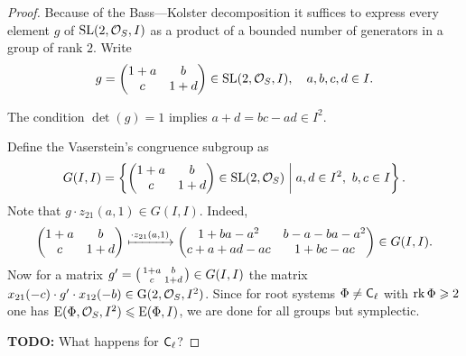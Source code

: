 \begin{proof}
Because of the Bass---Kolster decomposition it suffices to express every element $g$ of $\operatorname{SL}(2,\mathcal{O}_S,I)$ as a product of a bounded number of generators in a group of rank $2$. Write
\[ g=\begin{pmatrix}1+a & b \\ c & 1+d\end{pmatrix}\in\operatorname{SL}(2,\mathcal{O}_S,I),\quad a,b,c,d\in I. \]

The condition $\det(g)=1$ implies $a+d=bc-ad\in I^2$.

Define the Vaserstein's congruence subgroup as
\[ G(I,I)=\left\{ \begin{pmatrix}1+a & b \\ c & 1+d\end{pmatrix}\in\SL(2,\mathcal{O}_S)\;\middle|\; a,d\in I^2,\ b,c\in I \right\}. \]
Note that $g\cdot z_{21}(a,1)\in G(I,I)$. Indeed,
\[
\begin{pmatrix}
1+a & b \\ c & 1+d
\end{pmatrix} \xmapsto{\cdot z_{21}(a,1)}
\begin{pmatrix}
1+ba-a^2 & b-a-ba-a^2 \\ c+a+ad-ac & 1+bc-ac
\end{pmatrix} \in G(I,I).
\]
Now for a matrix $g'=\begin{psmallmatrix}1+a & b \\ c & 1+d\end{psmallmatrix}\in G(I,I)$ the matrix $x_{21}(-c)\cdot g'\cdot x_{12}(-b)\in\operatorname{G}(2,\mathcal{O}_S,I^2)$. Since for root systems $\Phi\neq\mathsf{C}_\ell$ with $\operatorname{rk}\Phi\geqslant2$ one has $\operatorname{E}(\Phi,\mathcal{O}_S,I^2)\leqslant\operatorname{E}(\Phi,I)$, we are done for all groups but symplectic.

\textbf{TODO:} What happens for $\mathsf{C}_\ell$?
\end{proof}